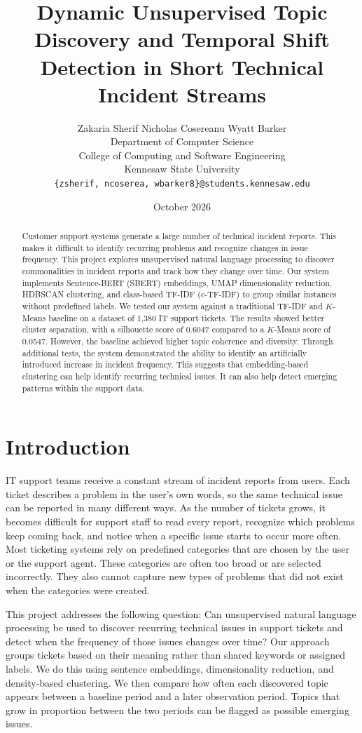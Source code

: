 \documentclass[11pt]{article}
\title{Dynamic Unsupervised Topic Discovery and Temporal Shift Detection in Short Technical Incident Streams}
\author{
  Zakaria Sherif \quad Nicholas Cosereanu \quad Wyatt Barker \\
  Department of Computer Science \\
  College of Computing and Software Engineering \\
  Kennesaw State University \\
  \texttt{\{zsherif, ncoserea, wbarker8\}@students.kennesaw.edu}
}
\date{October 2026}
\begin{document}
\maketitle

\begin{abstract}
Customer support systems generate a large number of technical incident reports. This makes it difficult to identify recurring problems and recognize changes in issue frequency. This project explores unsupervised natural language processing to discover commonalities in incident reports and track how they change over time. Our system implements Sentence-BERT (SBERT) embeddings, UMAP dimensionality reduction, HDBSCAN clustering, and class-based TF-IDF (c-TF-IDF) to group similar instances without predefined labels. We tested our system against a traditional TF-IDF and $K$-Means baseline on a dataset of 1,380 IT support tickets. The results showed better cluster separation, with a silhouette score of 0.6047 compared to a $K$-Means score of 0.0547. However, the baseline achieved higher topic coherence and diversity. Through additional tests, the system demonstrated the ability to identify an artificially introduced increase in incident frequency. This suggests that embedding-based clustering can help identify recurring technical issues. It can also help detect emerging patterns within the support data.
\end{abstract}

\section{Introduction}
IT support teams receive a constant stream of incident reports from users. Each ticket describes a problem in the user's own words, so the same technical issue can be reported in many different ways. As the number of tickets grows, it becomes difficult for support staff to read every report, recognize which problems keep coming back, and notice when a specific issue starts to occur more often. Most ticketing systems rely on predefined categories that are chosen by the user or the support agent. These categories are often too broad or are selected incorrectly. They also cannot capture new types of problems that did not exist when the categories were created.

This project addresses the following question: Can unsupervised natural language processing be used to discover recurring technical issues in support tickets and detect when the frequency of those issues changes over time? Our approach groups tickets based on their meaning rather than shared keywords or assigned labels. We do this using sentence embeddings, dimensionality reduction, and density-based clustering. We then compare how often each discovered topic appears between a baseline period and a later observation period. Topics that grow in proportion between the two periods can be flagged as possible emerging issues.
\end{document}
